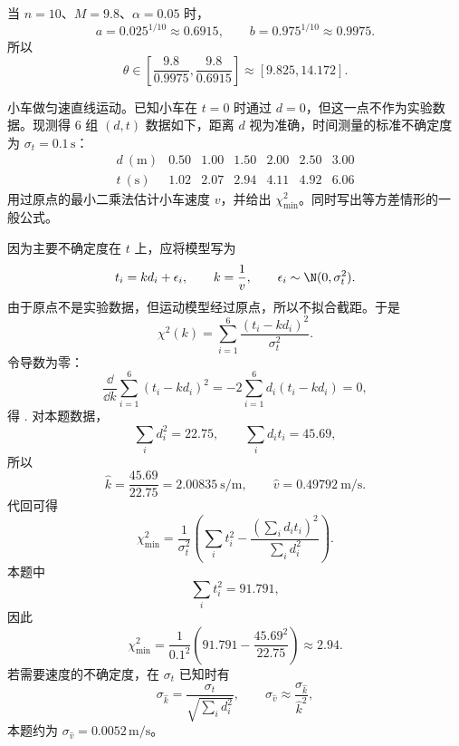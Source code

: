 \begin{question}[均匀分布端点估计]
\begin{solution}
\begin{enumerate}
当 $n=10$、$M=9.8$、$\alpha=0.05$ 时，
\[
a=0.025^{1/10}\approx0.6915,
\qquad
b=0.975^{1/10}\approx0.9975.
\]
所以
\[
\theta\in\left[\frac{9.8}{0.9975},\frac{9.8}{0.6915}\right]
\approx[9.825,14.172].
\]
\end{enumerate}
\end{solution}
\end{question}

\begin{question}[过原点的加权最小二乘]
小车做匀速直线运动。已知小车在 $t=0$ 时通过 $d=0$，但这一点不作为实验数据。现测得 6 组 $(d,t)$ 数据如下，距离 $d$ 视为准确，时间测量的标准不确定度为 $\sigma_t=0.1\,\mathrm{s}$：
\[
\begin{array}{c|cccccc}
 d\ (\mathrm m) &0.50&1.00&1.50&2.00&2.50&3.00\\ \hline
 t\ (\mathrm s) &1.02&2.07&2.94&4.11&4.92&6.06
\end{array}
\]
用过原点的最小二乘法估计小车速度 $v$，并给出 $\chi^2_{\min}$。同时写出等方差情形的一般公式。
\begin{solution}
因为主要不确定度在 $t$ 上，应将模型写为
\[
t_i=kd_i+\epsilon_i,
\qquad k=\frac1v,
\qquad \epsilon_i\sim\N(0,\sigma_t^2).
\]
由于原点不是实验数据，但运动模型经过原点，所以不拟合截距。于是
\[
\chi^2(k)=\sum_{i=1}^6\frac{(t_i-kd_i)^2}{\sigma_t^2}.
\]
令导数为零：
\[
\frac{\dd}{\dd k}\sum_{i=1}^6(t_i-kd_i)^2
=-2\sum_{i=1}^6d_i(t_i-kd_i)=0,
\]
得
.
对本题数据，
\[
\sum_i d_i^2=22.75,
\qquad
\sum_i d_it_i=45.69,
\]
所以
\[
\hat k=\frac{45.69}{22.75}=2.00835\ \mathrm{s/m},
\qquad
\hat v=0.49792\ \mathrm{m/s}.
\]
代回可得
\[
\chi^2_{\min}
=\frac1{\sigma_t^2}\left(\sum_i t_i^2-\frac{(\sum_i d_it_i)^2}{\sum_i d_i^2}\right).
\]
本题中
\[
\sum_i t_i^2=91.791,
\]
因此
\[
\chi^2_{\min}
=\frac1{0.1^2}\left(91.791-\frac{45.69^2}{22.75}\right)
\approx2.94.
\]
若需要速度的不确定度，在 $\sigma_t$ 已知时有
\[
\sigma_{\hat k}=\frac{\sigma_t}{\sqrt{\sum_i d_i^2}},
\qquad
\sigma_{\hat v}\approx\frac{\sigma_{\hat k}}{\hat k^2},
\]
本题约为 $\sigma_{\hat v}=0.0052\,\mathrm{m/s}$。
\end{solution}
\end{question}

